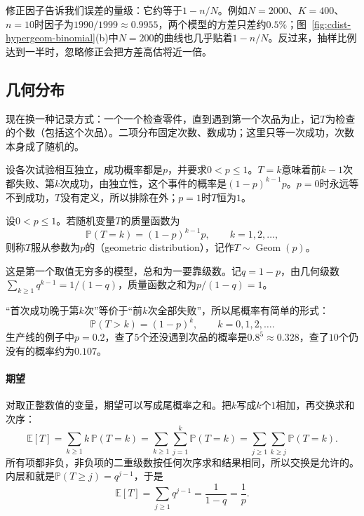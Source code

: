 修正因子告诉我们误差的量级：它约等于$1-n/N$。例如$N=2000$、$K=400$、$n=10$时因子为$1990/1999\approx0.9955$，两个模型的方差只差约$0.5\%$；图~\ref{fig:cdist-hypergeom-binomial}(b)中$N=200$的曲线也几乎贴着$1-n/N$。反过来，抽样比例达到一半时，忽略修正会把方差高估将近一倍。

\subsection{几何分布}
\label{sec:cdist-geometric}

现在换一种记录方式：一个一个检查零件，直到遇到第一个次品为止，记$T$为检查的个数（包括这个次品）。二项分布固定次数、数成功；这里只等一次成功，次数本身成了随机的。

设各次试验相互独立，成功概率都是$p$，并要求$0<p\leq1$。$T=k$意味着前$k-1$次都失败、第$k$次成功，由独立性，这个事件的概率是$(1-p)^{k-1}p$。$p=0$时永远等不到成功，$T$没有定义，所以排除在外；$p=1$时$T$恒为$1$。

\begin{definition}[几何分布]
\label{def:cdist-geometric}
设$0<p\leq1$。若随机变量$T$的质量函数为
\begin{equation}
  \mathbb{P}(T=k)=(1-p)^{k-1}p,\qquad k=1,2,\dots,
  \label{eq:cdist-geometric-pmf}
\end{equation}
则称$T$服从参数为$p$的（geometric distribution），记作$T\sim\operatorname{Geom}(p)$。
\end{definition}

这是第一个取值无穷多的模型，总和为一要靠级数。记$q=1-p$，由几何级数$\sum_{k\geq1}q^{k-1}=1/(1-q)$，质量函数之和为$p/(1-q)=1$。

“首次成功晚于第$k$次”等价于“前$k$次全部失败”，所以尾概率有简单的形式：
\begin{equation}
  \mathbb{P}(T>k)=(1-p)^{k},\qquad k=0,1,2,\dots .
  \label{eq:cdist-geometric-tail}
\end{equation}
生产线的例子中$p=0.2$，查了$5$个还没遇到次品的概率是$0.8^{5}\approx0.328$，查了$10$个仍没有的概率约为$0.107$。

\paragraph{期望}
对取正整数值的变量，期望可以写成尾概率之和。把$k$写成$k$个$1$相加，再交换求和次序：
\[
  \mathbb{E}[T]=\sum_{k\geq1}k\,\mathbb{P}(T=k)=\sum_{k\geq1}\sum_{j=1}^{k}\mathbb{P}(T=k)
  =\sum_{j\geq1}\sum_{k\geq j}\mathbb{P}(T=k).
\]
所有项都非负，非负项的二重级数按任何次序求和结果相同，所以交换是允许的。内层和就是$\mathbb{P}(T\geq j)=q^{j-1}$，于是
\[
  \mathbb{E}[T]=\sum_{j\geq1}q^{j-1}=\frac{1}{1-q}=\frac1p .
\]

